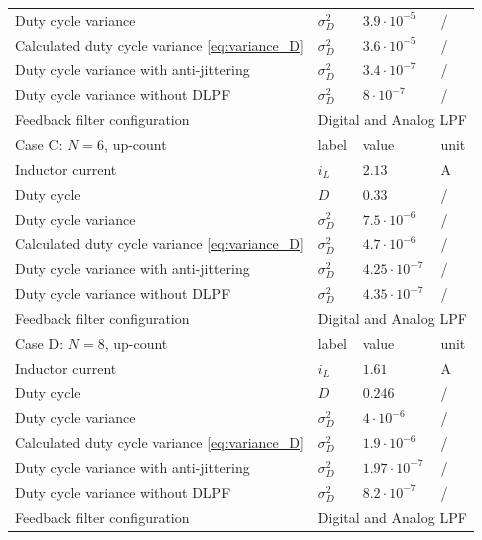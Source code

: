 \documentclass[journal]{IEEEtran}
\begin{document}
\begin{table}[h!]
\begin{tabular}{llll}
                  Duty cycle variance   								& $\sigma ^2 _D $    		& $3.9 \cdot 10^{-5}$   & /\\
				  Calculated duty cycle variance \eqref{eq:variance_D}	& $\sigma ^2 _D$      		& $3.6 \cdot 10^{-5}$   & /\\                  
				  Duty cycle variance with anti-jittering    			& $\sigma ^2 _D$      		& $3.4 \cdot 10^{-7}$    & /\\
                  Duty cycle variance without DLPF    					& $\sigma ^2 _D$      		& $8 \cdot 10^{-7}$    & /\\
                  Feedback filter configuration							& \multicolumn{3}{l}{Digital and Analog LPF}\\
                  \midrule\midrule        
        		  Case C: $N = 6$, up-count 											& label 					& value 			& unit \\
        		  \midrule
                  Inductor current   									& $i_{L}$      				& $2.13$    			& A\\ 
                  Duty cycle    										& $D$      					& $0.33$    		& /\\
                  Duty cycle variance   								& $\sigma ^2 _D $    		& $7.5 \cdot 10^{-6}$   & /\\
				  Calculated duty cycle variance \eqref{eq:variance_D}	& $\sigma ^2 _D$      		& $4.7 \cdot 10^{-6}$   & /\\                  
				  Duty cycle variance with anti-jittering    			& $\sigma ^2 _D$      		& $4.25 \cdot 10^{-7}$    & /\\
                  Duty cycle variance without DLPF    					& $\sigma ^2 _D$      		& $4.35 \cdot 10^{-7}$    & /\\
                  Feedback filter configuration							& \multicolumn{3}{l}{Digital and Analog LPF}\\
                  \midrule\midrule    
                  Case D: $N = 8$, up-count  											& label 					& value 			& unit \\
        		  \midrule
                  Inductor current   									& $i_{L}$      				& $1.61$    			& A\\ 
                  Duty cycle    										& $D$      					& $0.246$    		& /\\
                  Duty cycle variance   								& $\sigma ^2 _D $    		& $4 \cdot 10^{-6}$   & /\\
				  Calculated duty cycle variance \eqref{eq:variance_D}	& $\sigma ^2 _D$      		& $1.9 \cdot 10^{-6}$   & /\\                  
				  Duty cycle variance with anti-jittering    			& $\sigma ^2 _D$      		& $1.97 \cdot 10^{-7}$    & /\\
                  Duty cycle variance without DLPF    					& $\sigma ^2 _D$      		& $8.2 \cdot 10^{-7}$    & /\\
                  Feedback filter configuration							& \multicolumn{3}{l}{Digital and Analog LPF}\\
                  \midrule\midrule       
              \end{tabular}
\end{table}
\end{document}
